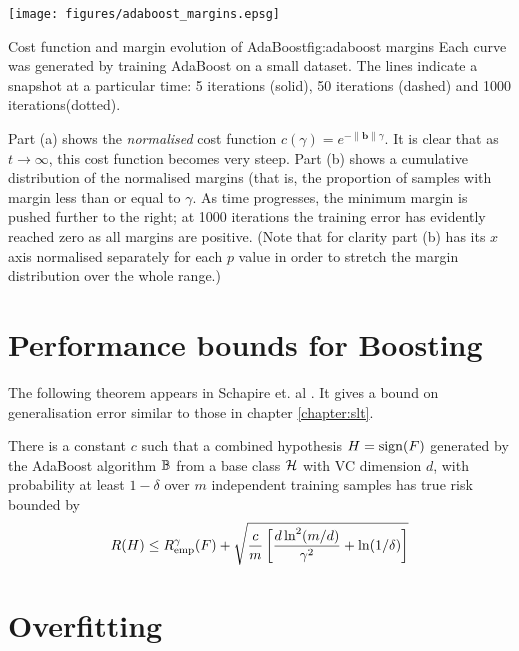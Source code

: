 \begin{linefigure}
\begin{center}
\texttt{[image: figures/adaboost\_margins.epsg]}
\end{center}
\begin{capt}{Cost function and margin evolution of
AdaBoost}{fig:adaboost margins}
Each curve was generated by training AdaBoost on a small dataset.  The
lines indicate a snapshot at a particular time: 5 iterations (solid),
50 iterations (dashed) and 1000 iterations(dotted).

Part (a) shows the \emph{normalised} cost function $c(\gamma) =
e^{-\|\mathbf{b}\| \gamma}$.  It is clear that as $t \rightarrow \infty$,
this cost function becomes very steep.  Part (b) shows a cumulative
distribution of the normalised margins (that is, the proportion of
samples with margin less than or equal to $\gamma$.  As time
progresses, the minimum margin is pushed further to the right; at 1000
iterations the training error has evidently reached zero as all
margins are positive.  (Note that for clarity part (b) has its $x$
axis normalised separately for each $p$ value in order to stretch the
margin distribution over the whole range.)
\end{capt}
\end{linefigure}


\section{Performance bounds for Boosting}

The following theorem appears in Schapire et. al \cite{Schapire97}.
It gives a bound on generalisation error similar to those in chapter
\ref{chapter:slt}.

\begin{theorem}[Performance bound for boosting ($p$=1)]

There is a constant $c$ such that a combined hypothesis $H = \mathrm{sign}(F)$
generated by the AdaBoost algorithm $\mathbb{B}$ from a base class $\mathcal{H}$
with VC dimension $d$, with probability at least $1 - \delta$ over $m$
independent training samples has true risk bounded by 
\begin{equation}
R(H) \leq R_{\mathrm{emp}}^{\gamma}(F) + \sqrt{\frac{c}{m} \left[ \frac{d
\ln^2 (m/d)}{\gamma^2} + \ln(1/\delta) \right] }
\end{equation}
\end{theorem}


\section{Overfitting}
\label{sec:boost overfitting}

